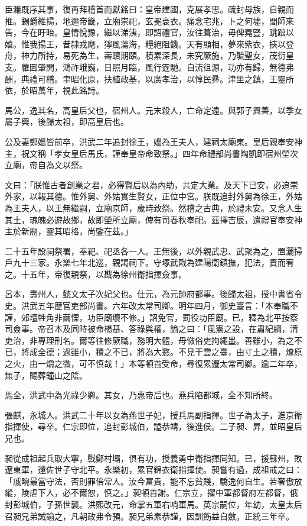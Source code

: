 \begin{pinyinscope}
臣濂既序其事，復再拜稽首而獻銘曰：皇帝建國，克展孝思。疏封母族，自親而推。錫爵維揚，地邇帝畿，立廟崇祀，玄冕袞衣。痛念宅兆，卜之何墟，閭師來告，今在盱眙。皇情悅豫，繼以涕洟，即詔禮官，汝往葺治，毋俾蕘豎，跳踉以嬉。惟我揚王，昔隸戎麾，獰風蕩海，糧絕阻饑。天有顯相，夢來紫衣，挾以登舟，神力所持，易死為生，壽躋期頤。積累深長，未究厥施，乃毓聖女，茂衍皇支。蘿圖肇開，鴻祚峨巍，日照月臨，風行霆馳。自流徂源，功亦有歸，無德弗酬，典禮可稽。聿昭化原，扶植政基，以廣孝治，以惇民彞。津里之鎮，王靈所依，於昭萬年，視此銘詩。

馬公，逸其名，高皇后父也，宿州人。元末殺人，亡命定遠。與郭子興善，以季女屬子興，後歸太祖，即高皇后也。

公及妻鄭媼皆前卒，洪武二年追封徐王，媼為王夫人，建祠太廟東。皇后親奉安神主，祝文稱「孝女皇后馬氏，謹奉皇帝命致祭。」四年命禮部尚書陶凱即宿州塋次立廟，帝自為文以祭。

文曰：「朕惟古者創業之君，必得賢后以為內助，共定大業。及天下已安，必追崇外家，以報其德。惟外舅、外姑實生賢女，正位中宮。朕既追封外舅為徐王，外姑為王夫人，以王無繼嗣，立廟京師，歲時致祭。然稽之古典，於禮未安。又念人生其土，魂魄必遊故鄉，故即塋所立廟，俾有司春秋奉祀。茲擇吉辰，遣禮官奉安神主於新廟，靈其昭格，尚鑒在茲。」

二十五年設祠祭署，奉祀、祀丞各一人。王無後，以外親武忠、武聚為之，置灑掃戶九十三家。永樂七年北巡，親謁祠下。守塚武戡為建陽衛鎮撫，犯法，責而宥之。十五年，帝復親祭，以戡為徐州衛指揮僉事。

呂本，壽州人，懿文太子次妃父也。仕元，為元帥府都事。後歸太祖，授中書省令史。洪武五年歷官吏部尚書。六年改太常司卿。明年四月，御史臺言：「本奉職不謹，郊壇牲角非繭慄，功臣廟壞不修。」詔免官，罰役功臣廟。已，釋為北平按察司僉事。帝召本及同時被命楊基、答祿與權，諭之曰：「風憲之設，在肅紀綱，清吏治，非專理刑名。爾等往修厥職，務明大體，毋傚俗吏拘繩墨。善雖小，為之不已，將成全德；過雖小，積之不已，將為大憝。不見干雲之臺，由寸土之積，燎原之火，由一爝之微，可不慎哉！」本等頓首受命，尋復累遷太常司卿。逾二年卒，無子，賜葬鐘山之陰。

馬全，洪武中為光祿少卿。其女，乃惠帝后也。燕兵陷都城，全不知所終。

張麒，永城人。洪武二十年以女為燕世子妃，授兵馬副指揮。世子為太子，進京衛指揮使，尋卒。仁宗即位，追封彭城伯，謚恭靖，後進侯。二子昶、昇，並昭皇后兄也。

昶從成祖起兵取大寧，戰鄭村壩，俱有功，授義勇中衛指揮同知。已，援蘇州，敗遼東軍，還佐世子守北平。永樂初，累官錦衣衛指揮使。昶嘗有過，成祖戒之曰：「戚畹最當守法，否則罪倍常人。汝今富貴，能不忘貧賤，驕逸何自生。若奢傲放縱，陵虐下人，必不爾恕，慎之。」昶頓首謝。仁宗立，擢中軍都督府左都督，俄封彭城伯，子孫世襲。洪熙改元，命掌五軍右哨軍馬。英宗嗣位，年幼，太皇太后召昶兄弟誡諭之，凡朝政弗令預。昶兄弟素恭謹，因訓飭益自斂。正統三年卒。


\end{pinyinscope}
